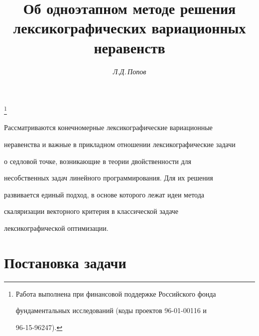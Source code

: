 

\author{\it Л.Д.\,Попов}




\title{Об одноэтапном методе решения\\ 


лексикографических вариационных неравенств}





\thanks{Работа выполнена при финансовой поддержке Российского фонда


фундаментальных исследований (коды проектов 96-01-00116 и


96-15-96247).}


\date{}







\pagestyle{plain} %













\maketitle


\label{begin}





Рассматриваются конечномерные лексикографические вариационные


неравенства и важные в прикладном отношении лексикографические задачи


о седловой точке, возникающие в теории двойственности для


несобственных задач линейного программирования. Для их решения


развивается единый подход, в основе которого лежат идеи метода


скаляризации векторного критерия в классической задаче


лексикографической оптимизации.





\section{Постановка задачи}





